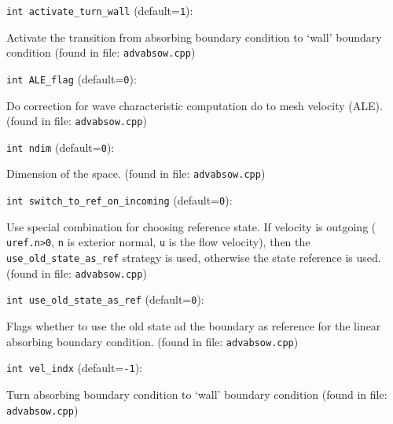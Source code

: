 \item\verb+int activate_turn_wall+ {\rm(default=\verb|1|)}:

Activate the transition from absorbing boundary condition
 to `wall' boundary condition
 (found in file: \verb+advabsow.cpp+)
\item\verb+int ALE_flag+ {\rm(default=\verb|0|)}:

Do correction for wave characteristic computation
 do to mesh velocity (ALE).
 (found in file: \verb+advabsow.cpp+)
\item\verb+int ndim+ {\rm(default=\verb|0|)}:

Dimension of the space.
 (found in file: \verb+advabsow.cpp+)
\item\verb+int switch_to_ref_on_incoming+ {\rm(default=\verb|0|)}:

Use special combination for choosing reference state.
 If velocity is outgoing ( \verb+uref.n>0+, \verb+n+ is exterior
 normal, \verb+u+ is the flow velocity), then the
 \verb+use_old_state_as_ref+ strategy is used, otherwise the
 state reference is used. 
 (found in file: \verb+advabsow.cpp+)
\item\verb+int use_old_state_as_ref+ {\rm(default=\verb|0|)}:

Flags whether to use the old state ad the
boundary as reference for the linear absorbing
boundary condition.
 (found in file: \verb+advabsow.cpp+)
\item\verb+int vel_indx+ {\rm(default=\verb|-1|)}:

Turn absorbing boundary condition to `wall' boundary condition
 (found in file: \verb+advabsow.cpp+)
